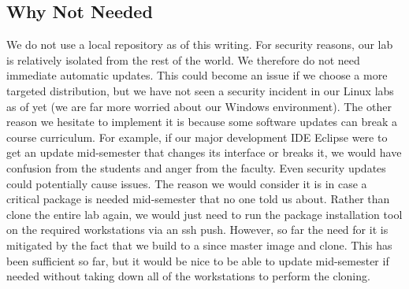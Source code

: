 \subsection{Why Not Needed}
We do not use a local repository as of this writing.  For security reasons, our lab is relatively isolated from the rest of the world.  We therefore do not need immediate automatic updates.  This could become an issue if we choose a more targeted distribution, but we have not seen a security incident in our Linux labs as of yet (we are far more worried about our Windows environment).  The other reason we hesitate to implement it is because some software updates can break a course curriculum.  For example, if our major development IDE Eclipse were to get an update mid-semester that changes its interface or breaks it, we would have confusion from the students and anger from the faculty.  Even security updates could potentially cause issues.  The reason we would consider it is in case a critical package is needed mid-semester that no one told us about.  Rather than clone the entire lab again, we would just need to run the package installation tool on the required workstations via an ssh push.  However, so far the need for it is mitigated by the fact that we build to a since master image and clone. This has been sufficient so far, but it would be nice to be able to update mid-semester if needed without taking down all of the workstations to perform the cloning. 
